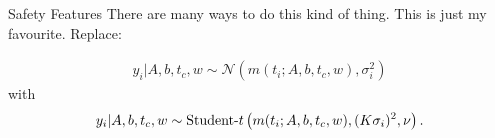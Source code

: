 \begin{frame}[t]{Safety Features}
There are many ways to do this kind of thing. This is just my favourite.
Replace:

\begin{eqnarray*}
y_i | A, b, t_c, w \sim \mathcal{N}\left(m(t_i; A, b, t_c, w), \sigma_i^2\right)
\end{eqnarray*}
with
\begin{eqnarray*}
y_i | A, b, t_c, w \sim \textnormal{Student-}t\left(m(t_i; A, b, t_c, w), (K\sigma_i)^2, \nu\right).
\end{eqnarray*}

\end{frame}

